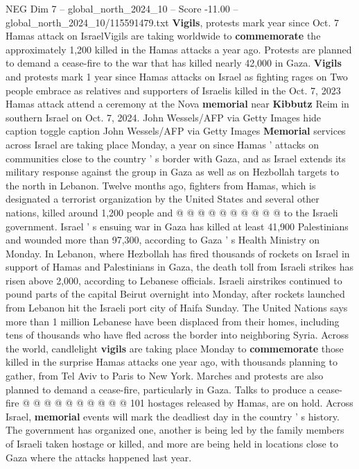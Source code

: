 \begin{textsample}{NEG Dim 7 – global\_north\_2024\_10 – Score -11.00 – global\_north\_2024\_10/115591479.txt}  \label{ex:f7_neg_033}
\textbf{Vigils}, protests mark year since Oct. 7 Hamas attack on IsraelVigils are taking worldwide to \textbf{commemorate} the approximately 1,200 killed in the Hamas attacks a year ago.
Protests are planned to demand a cease-fire to the war that has killed nearly 42,000 in Gaza. \textbf{Vigils} and protests mark 1 year since Hamas attacks on Israel as fighting rages on Two people embrace as relatives and supporters of Israelis killed in the Oct. 7, 2023 Hamas attack attend a ceremony at the Nova \textbf{memorial} near \textbf{Kibbutz} Reim in southern Israel on Oct. 7, 2024.
John Wessels/AFP via Getty Images hide caption toggle caption John Wessels/AFP via Getty Images \textbf{Memorial} services across Israel are taking place Monday, a year on since Hamas ' attacks on communities close to the country ' s border with Gaza, and as Israel extends its military response against the group in Gaza as well as on Hezbollah targets to the north in Lebanon.
Twelve months ago, fighters from Hamas, which is designated a terrorist organization by the United States and several other nations, killed around 1,200 people and @ @ @ @ @ @ @ @ @ @ to the Israeli government.
Israel ' s ensuing war in Gaza has killed at least 41,900 Palestinians and wounded more than 97,300, according to Gaza ' s Health Ministry on Monday.
In Lebanon, where Hezbollah has fired thousands of rockets on Israel in support of Hamas and Palestinians in Gaza, the death toll from Israeli strikes has risen above 2,000, according to Lebanese officials.
Israeli airstrikes continued to pound parts of the capital Beirut overnight into Monday, after rockets launched from Lebanon hit the Israeli port city of Haifa Sunday.
The United Nations says more than 1 million Lebanese have been displaced from their homes, including tens of thousands who have fled across the border into neighboring Syria.
Across the world, candlelight \textbf{vigils} are taking place Monday to \textbf{commemorate} those killed in the surprise Hamas attacks one year ago, with thousands planning to gather, from Tel Aviv to Paris to New York.
Marches and protests are also planned to demand a cease-fire, particularly in Gaza.
Talks to produce a cease-fire @ @ @ @ @ @ @ @ @ @ 101 hostages released by Hamas, are on hold.
Across Israel, \textbf{memorial} events will mark the deadliest day in the country ' s history.
The government has organized one, another is being led by the family members of Israeli taken hostage or killed, and more are being held in locations close to Gaza where the attacks happened last year.

\end{textsample}
